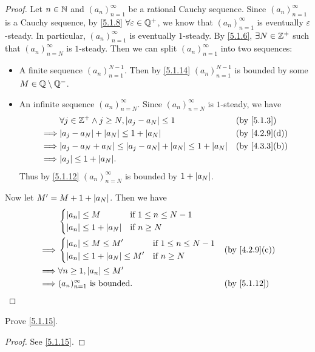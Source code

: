 \begin{proof}
  Let \(n \in \mathbb{N}\) and \((a_n)_{n = 1}^{\infty}\) be a rational Cauchy sequence.
  Since \((a_n)_{n = 1}^{\infty}\) is a Cauchy sequence, by \cref{5.1.8} \(\forall \varepsilon \in \mathbb{Q}^+\), we know that \((a_n)_{n = 1}^{\infty}\) is eventually \(\varepsilon\)-steady.
  In particular, \((a_n)_{n = 1}^{\infty}\) is eventually \(1\)-steady.
  By \cref{5.1.6}, \(\exists N \in \mathbb{Z}^+\) such that \((a_n)_{n = N}^{\infty}\) is \(1\)-steady.
  Then we can split \((a_n)_{n = 1}^{\infty}\) into two sequences:
  \begin{itemize}
    \item A finite sequence \((a_n)_{n = 1}^{N - 1}\).
          Then by \cref{5.1.14} \((a_n)_{n = 1}^{N - 1}\) is bounded by some \(M \in \mathbb{Q} \setminus \mathbb{Q}^-\).
    \item An infinite sequence \((a_n)_{n = N}^{\infty}\).
          Since \((a_n)_{n = N}^\infty\) is \(1\)-steady, we have
          \begin{align*}
                     & \forall j \in \Z^+ \land j \geq N, \abs{a_j - a_N} \leq 1                 &  & \by{5.1.3}                  \\
            \implies & \abs{a_j - a_N} + \abs{a_N} \leq 1 + \abs{a_N}                            &  & \text{(by \cref{4.2.9}(d))} \\
            \implies & \abs{a_j - a_N + a_N} \leq \abs{a_j - a_N} + \abs{a_N} \leq 1 + \abs{a_N} &  & \text{(by \cref{4.3.3}(b))} \\
            \implies & \abs{a_j} \leq 1 + \abs{a_N}.
          \end{align*}
          Thus by \cref{5.1.12} \((a_n)_{n = N}^\infty\) is bounded by \(1 + \left\lvert a_N\right\rvert\).
  \end{itemize}
  Now let \(M' = M + 1 + \left\lvert a_N\right\rvert\).
  Then we have
  \begin{align*}
             & \begin{dcases}
                 \abs{a_n} \leq M             & \text{if } 1 \leq n \leq N - 1 \\
                 \abs{a_n} \leq 1 + \abs{a_N} & \text{if } n \geq N
               \end{dcases}                             \\
    \implies & \begin{dcases}
                 \abs{a_n} \leq M \leq M'             & \text{if } 1 \leq n \leq N - 1 \\
                 \abs{a_n} \leq 1 + \abs{a_N} \leq M' & \text{if } n \geq N
               \end{dcases} &  & \text{(by \cref{4.2.9}(c))}                     \\
    \implies & \forall n \geq 1, \abs{a_n} \leq M'                                                       \\
    \implies & (a_n)_{n = 1}^\infty \text{ is bounded}.                                 &  & \by{5.1.12}
  \end{align*}
\end{proof}

\exercisesection

\begin{ex}\label{ex:5.1.1}
  Prove \cref{5.1.15}.
\end{ex}

\begin{proof}
  See \cref{5.1.15}.
\end{proof}
